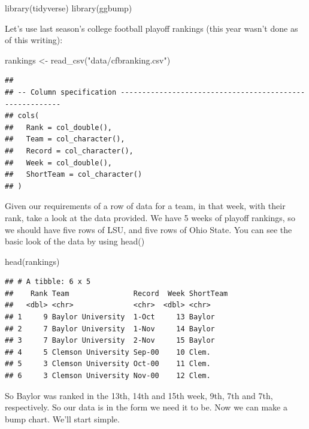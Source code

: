 \documentclass[
]{book}
\newenvironment{Shaded}{\begin{snugshade}}{\end{snugshade}}
\newcommand{\FunctionTok}[1]{\textcolor[rgb]{0.00,0.00,0.00}{#1}}
\newcommand{\NormalTok}[1]{#1}
\newcommand{\OtherTok}[1]{\textcolor[rgb]{0.56,0.35,0.01}{#1}}
\newcommand{\StringTok}[1]{\textcolor[rgb]{0.31,0.60,0.02}{#1}}
\begin{document}
\begin{Shaded}
\begin{Highlighting}[]
\FunctionTok{library}\NormalTok{(tidyverse)}
\FunctionTok{library}\NormalTok{(ggbump)}
\end{Highlighting}
\end{Shaded}

Let's use last season's college football playoff rankings (this year wasn't done as of this writing):

\begin{Shaded}
\begin{Highlighting}[]
\NormalTok{rankings }\OtherTok{\textless{}{-}} \FunctionTok{read\_csv}\NormalTok{(}\StringTok{"data/cfbranking.csv"}\NormalTok{)}
\end{Highlighting}
\end{Shaded}

\begin{verbatim}
## 
## -- Column specification --------------------------------------------------------
## cols(
##   Rank = col_double(),
##   Team = col_character(),
##   Record = col_character(),
##   Week = col_double(),
##   ShortTeam = col_character()
## )
\end{verbatim}

Given our requirements of a row of data for a team, in that week, with their rank, take a look at the data provided. We have 5 weeks of playoff rankings, so we should have five rows of LSU, and five rows of Ohio State. You can see the basic look of the data by using head()

\begin{Shaded}
\begin{Highlighting}[]
\FunctionTok{head}\NormalTok{(rankings)}
\end{Highlighting}
\end{Shaded}

\begin{verbatim}
## # A tibble: 6 x 5
##    Rank Team               Record  Week ShortTeam
##   <dbl> <chr>              <chr>  <dbl> <chr>    
## 1     9 Baylor University  1-Oct     13 Baylor   
## 2     7 Baylor University  1-Nov     14 Baylor   
## 3     7 Baylor University  2-Nov     15 Baylor   
## 4     5 Clemson University Sep-00    10 Clem.    
## 5     3 Clemson University Oct-00    11 Clem.    
## 6     3 Clemson University Nov-00    12 Clem.
\end{verbatim}

So Baylor was ranked in the 13th, 14th and 15th week, 9th, 7th and 7th, respectively. So our data is in the form we need it to be. Now we can make a bump chart. We'll start simple.
\end{document}
